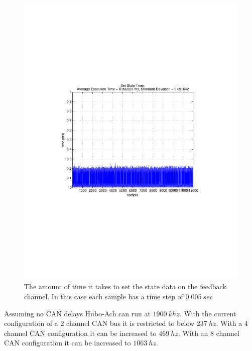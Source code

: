 \begin{figure}[thpb]
  \centering
\includegraphics[width=0.6\columnwidth]{./timingData/setState.pdf}
  \caption{The amount of time it takes to set the state data on the feedback channel.  In this case each sample has a time step of $0.005~sec$}
  \label{fig:timing-setstate}
\end{figure}




Assuming no CAN delays Hubo-Ach can run at $1900~khz$.
With the current configuration of a 2 channel CAN bus it is restricted to below $237~hz$.
With a 4 channel CAN configuration it can be increased to $469~hz$.
With an 8 channel CAN configuration it can be increased to $1063~hz$.





























